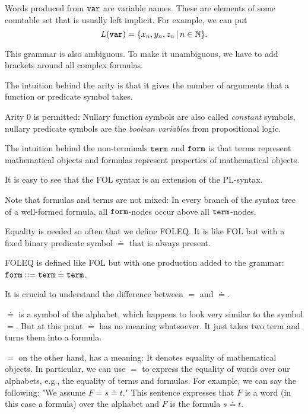 Words produced from $\mathtt{var}$ are variable names.
These are elements of some countable set that is usually left implicit.
For example, we can put
\[L(\mathtt{var})=\{x_n,y_n,z_n \,|\, n\in \mathbb{N}\}.\]

This grammar is also ambiguous. To make it unambiguous, we have to add brackets around all complex formulas.

\begin{remark}
The intuition behind the arity is that it gives the number of arguments that a function or predicate symbol takes.

Arity $0$ is permitted: Nullary function symbols are also called \emph{constant} symbols, nullary predicate symbols are the \emph{boolean variables} from propositional logic.
\end{remark}

\begin{remark}
The intuition behind the non-terminals $\mathtt{term}$ and $\mathtt{form}$ is that terms represent mathematical objects and formulas represent properties of mathematical objects.

It is easy to see that the FOL syntax is an extension of the PL-syntax.

Note that formulas and terms are not mixed: In every branch of the syntax tree of a well-formed formula, all $\mathtt{form}$-nodes occur above all $\mathtt{term}$-nodes.
\end{remark}

Equality is needed so often that we define FOLEQ. It is like FOL but with a fixed binary predicate symbol $\doteq$ that is always present.

\begin{definition}
FOLEQ is defined like FOL but with one production added to the grammar: $\mathtt{form} ::= \mathtt{term} \doteq \mathtt{term}$.
\end{definition}

\begin{remark}[Equality]
It is crucial to understand the difference between $=$ and $\doteq$.

$\doteq$ is a symbol of the alphabet, which happens to look very similar to the symbol $=$.
But at this point $\doteq$ has no meaning whatsoever.
It just takes two term and turns them into a formula.

$=$ on the other hand, has a meaning: It denotes equality of mathematical objects.
In particular, we can use $=$ to express the equality of words over our alphabets, e.g., the equality of terms and formulas.
For example, we can say the following: "We assume $F=s\doteq t$." This sentence expresses that $F$ is a word (in this case a formula) over the alphabet and $F$ is the formula $s\doteq t$.
\end{remark}


